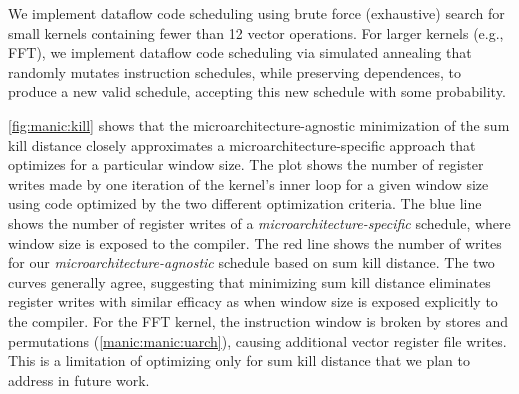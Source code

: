 We implement dataflow code scheduling using brute force (exhaustive) search
for small kernels containing fewer than 12 vector operations.  For larger
kernels (e.g., FFT), we implement dataflow code scheduling via simulated
annealing that randomly mutates instruction schedules, 
while preserving dependences, to produce a new valid schedule, accepting 
this new schedule with some probability.

\figMANICKill

\autoref{fig:manic:kill} shows that the microarchitecture-agnostic minimization of
the sum kill distance closely approximates a microarchitecture-specific
approach that optimizes for a particular window size.
%
The plot shows the number of register writes made by one iteration of the
kernel's inner loop for a given window size using code optimized by the two
different optimization criteria. 
%
The blue line shows the number of register writes of a \emph{microarchitecture-specific} schedule,
where window size is exposed to the compiler.  The red line shows the number of writes
for our \emph{microarchitecture-agnostic} schedule based on sum kill distance.
%
The two curves generally agree, suggesting that minimizing sum kill distance eliminates
register writes with similar efficacy as when window size is exposed explicitly to the compiler.
%
For the FFT kernel, the instruction window is broken by stores and permutations (\autoref{manic:manic:uarch}),
causing additional vector register file writes.
This is a limitation of optimizing only for sum kill distance
that we plan to address in future work.
